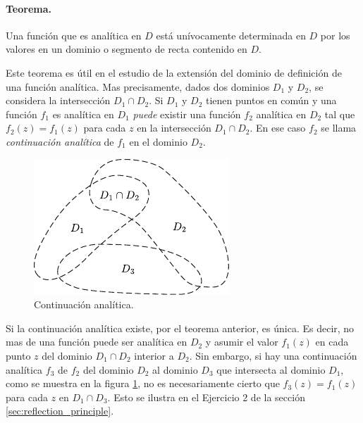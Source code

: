 \documentclass[a4paper]{report}
\begin{document}
\paragraph{Teorema.} Una función que es analítica en \(D\) está unívocamente determinada en \(D\) por los valores en un dominio o segmento de recta contenido en \(D\).

Este teorema es útil en el estudio de la extensión del dominio de definición de una función analítica. Mas precisamente, dados dos dominios \(D_1\) y \(D_2\), se considera la intersección \(D_1\cap D_2\). Si \(D_1\) y \(D_2\) tienen puntos en común y una función \(f_1\) es analítica en \(D_1\) \emph{puede} existir una función \(f_2\) analítica en \(D_2\) tal que \(f_2(z)=f_1(z)\) para cada \(z\) en la intersección \(D_1\cap D_2\). En ese caso \(f_2\) se llama \emph{continuación analítica} de \(f_1\) en el dominio \(D_2\).
\begin{figure}[!htb]
  \begin{minipage}[c]{0.4\textwidth}
    \includegraphics[width=\textwidth]{figuras/analytic_continuation.pdf}
  \end{minipage}\hfill
  \begin{minipage}[c]{0.5\textwidth}
    \caption{
       Continuación analítica.
    } \label{fig:analytic_continuation}
  \end{minipage}
\end{figure}

Si la continuación analítica existe, por el teorema anterior, es única. Es decir, no mas de una función puede ser analítica en \(D_2\) y asumir el valor \(f_1(z)\) en cada punto \(z\) del dominio \(D_1\cap D_2\) interior a \(D_2\). Sin embargo, si hay una continuación analítica \(f_3\) de \(f_2\) del dominio \(D_2\) al dominio \(D_3\) que intersecta al dominio \(D_1\), como se muestra en la figura \ref{fig:analytic_continuation}, no es necesariamente cierto que \(f_3(z)=f_1(z)\) para cada \(z\) en \(D_1\cap D_3\). Esto se ilustra en el Ejercicio 2 de la sección \ref{sec:reflection_principle}. 
\end{document}
